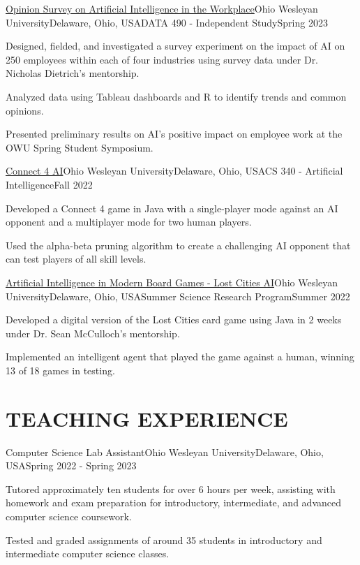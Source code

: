 \begin{researchentry}{\href{https://github.com/agopalareddy/DATA490}{Opinion Survey on Artificial Intelligence in the Workplace}}{Ohio Wesleyan University}{Delaware, Ohio, USA}{DATA 490 - Independent Study}{Spring 2023}
    \item Designed, fielded, and investigated a survey experiment on the impact of AI on 250 employees within each of four industries using survey data under Dr. Nicholas Dietrich's mentorship.
    \item Analyzed data using Tableau dashboards and R to identify trends and common opinions.
    \item Presented preliminary results on AI's positive impact on employee work at the OWU Spring Student Symposium.
\end{researchentry}

\begin{researchentry}{\href{https://github.com/agopalareddy/CS340Final-Connect4}{Connect 4 AI}}{Ohio Wesleyan University}{Delaware, Ohio, USA}{CS 340 - Artificial Intelligence}{Fall 2022}
    \item Developed a Connect 4 game in Java with a single-player mode against an AI opponent and a multiplayer mode for two human players.
    \item Used the alpha-beta pruning algorithm to create a challenging AI opponent that can test players of all skill levels.
\end{researchentry}

\begin{researchentry}{\href{https://github.com/agopalareddy/LostCities}{Artificial Intelligence in Modern Board Games - Lost Cities AI}}{Ohio Wesleyan University}{Delaware, Ohio, USA}{Summer Science Research Program}{Summer 2022}
    \item Developed a digital version of the Lost Cities card game using Java in 2 weeks under Dr. Sean McCulloch's mentorship.
    \item Implemented an intelligent agent that played the game against a human, winning 13 of 18 games in testing.
\end{researchentry}

\vspace{\headerSpacing}
\section{TEACHING EXPERIENCE}

\begin{experienceentry}{Computer Science Lab Assistant}{Ohio Wesleyan University}{Delaware, Ohio, USA}{Spring 2022 - Spring 2023}
    \item Tutored approximately ten students for over 6 hours per week, assisting with homework and exam preparation for introductory, intermediate, and advanced computer science coursework.
    \item Tested and graded assignments of around 35 students in introductory and intermediate computer science classes.
\end{experienceentry}

